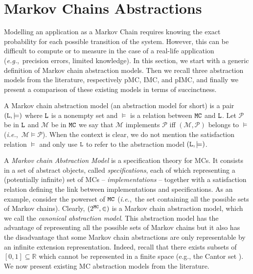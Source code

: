 \documentclass{llncs}
\newcommand{\mc}{\textnormal{MC}}
\newcommand{\imc}{\textnormal{IMC}}
\newcommand{\pimc}{\textnormal{pIMC}}
\newcommand{\pmc}{\textnormal{pMC}}
\newcommand{\mcSet} {\ensuremath{\tt{MC}}}
\newcommand{\aminstance}{\ensuremath{{\tt L}}}
\newcommand{\satisfaction}{\ensuremath{\models}}
\newcommand{\ie} {{\em i.e.},\ }
\newcommand{\eg} {{\em e.g.},\ }
\newcommand{\Rset}             {\ensuremath{\mathbb{R}}}
\begin{document}
\section{Markov Chains Abstractions}
\label{sec:abstraction-models}

Modelling an application as a Markov Chain requires knowing the exact
probability for each possible transition of the system.  However, this
can be difficult to compute or to measure in the case of a real-life
application (\eg precision errors, limited knowledge).  In this
section, we start with a generic definition of Markov chain
abstraction models. Then we recall three abstraction models from the
literature, respectively {\pmc}, {\imc}, and {\pimc}, and finally we
present a comparison of these existing models in terms of succinctness.

\begin{definition}\label{def:abstract_model}
	A Markov chain abstraction model (an abstraction model for short) is a pair $(\aminstance, \satisfaction)$ 
    where $\aminstance$ is a nonempty set and $\satisfaction$ is a relation between ${\mcSet}$ and $\aminstance$. 
    Let $\mathcal{P}$ be in $\aminstance$ and $\mathcal{M}$ be in {\mcSet}
    we say that $\mathcal{M}$ implements $\mathcal{P}$ 
    iff $(\mathcal{M}, \mathcal{P})$ belongs to $\satisfaction$ (\ie $\mathcal{M} \satisfaction \mathcal{P}$).
    When the context is clear, we do not mention the satisfaction relation $\satisfaction$ 
    and only use $\aminstance$ to refer to the abstraction model $(\aminstance, \satisfaction)$.
\end{definition}

A {\em Markov chain Abstraction Model} is a specification theory for
{\mc}s. It consists in a set of abstract objects, called {\em
  specifications}, each of which representing a (potentially infinite)
set of {\mc}s -- {\em implementations} -- together with a satisfaction
relation defining the link between implementations and specifications.
As an example, consider the powerset of {\mcSet} (\ie the set
containing all the possible sets of Markov chains). Clearly,
$(2^{\mcSet}, \in)$ is a Markov chain abstraction model, which we call
the {\em canonical abstraction model}.  This abstraction model has the
advantage of representing all the possible sets of Markov chains but
it also has the disadvantage that some Markov chain abstractions are
only representable by an infinite extension representation.  Indeed,
recall that there exists subsets of $[0,1] \subseteq \Rset$ which
cannot be represented in a finite space (e.g., the Cantor set
\cite{Cantor1883}).
%
We now present existing {\mc} abstraction models from the literature.
\end{document}
